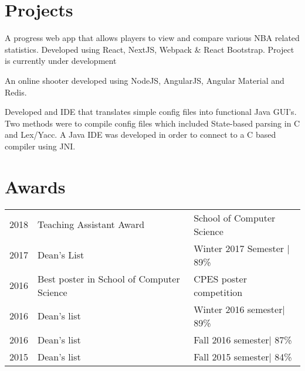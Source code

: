 \documentclass[]{deedy-resume-openfont}
\begin{document}
\begin{minipage}[t]{0.66\textwidth}
\sectionsep


\section{Projects}
A progress web app that allows players to view and compare various NBA related statistics. Developed using React, NextJS, Webpack & React Bootstrap.
Project is currently under development
\sectionsep

An online shooter developed using NodeJS, AngularJS, Angular Material and Redis.
\sectionsep

Developed and IDE that translates simple config files into functional Java GUI’s. Two methods were to compile config files which included State-based parsing in C and Lex/Yacc. A Java IDE was developed in order to connect to a C based compiler using JNI.
\sectionsep


\section{Awards} 
\begin{tabular}{rll}
2018         & Teaching Assistant Award &  School of Computer Science\\
2017	     & Dean's List   & Winter 2017 Semester | 89\%\\
2016	     & Best poster in School of Computer Science & CPES poster competition \\
2016	     & Dean’s list & Winter 2016 semester| 89\%\\
2016	     & Dean’s list & Fall 2016 semester| 87\%\\
2015	     & Dean’s list & Fall 2015 semester| 84\%\\
\end{tabular}

\end{minipage} 
\end{document}
